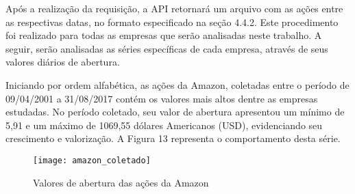 Após a realização da requisição, a API retornará um arquivo com as ações entre as respectivas datas, no formato especificado na seção 4.4.2. Este procedimento foi realizado para todas as empresas que serão analisadas neste trabalho. A seguir, serão analisadas as séries específicas de cada empresa, através de seus valores diários de abertura.

Iniciando por ordem alfabética, as ações da Amazon, coletadas entre o período de 09/04/2001 a 31/08/2017 contém os valores mais altos dentre as empresas estudadas. No período coletado, seu valor de abertura apresentou um mínimo de 5,91 e um máximo de 1069,55 dólares Americanos (USD), evidenciando seu crescimento e valorização. A Figura 13 representa o comportamento desta série.
\begin{figure}[h]
	\centering
	\centerline{\texttt{[image: amazon\_coletado]}}
	\caption{Valores de abertura das ações da Amazon}
	\label{exec-amazon-coleta}
\end{figure}